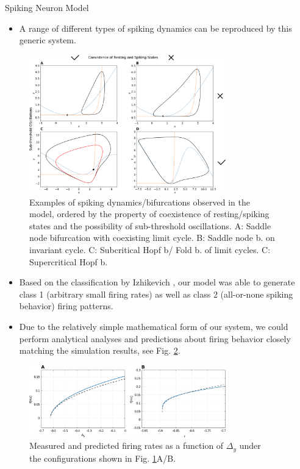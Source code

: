 \documentclass{beamer}
\begin{document}
\begin{frame}[t]
\begin{columns}[t]
\begin{column}{.45\textwidth}
\begin{myblock}{Spiking Neuron Model}
\begin{itemize}
\item A range of different types of spiking dynamics can be reproduced by this generic system.
\end{itemize}
\begin{figure}
\includegraphics[width=0.8\textwidth]{../figures/graphics/bif_types_combined_figure.png}
\caption{Examples of spiking dynamics/bifurcations observed in the model, ordered by the property of coexistence of resting/spiking states and the possibility of sub-threshold oscillations. A: Saddle node bifurcation with coexisting limit cycle. B: Saddle node b. on invariant cycle. C: Subcritical Hopf b/ Fold b. of limit cycles. C: Supercritical Hopf b.}
\label{fig:bif_types_combined}
\end{figure}
\begin{itemize}
\item Based on the classification by Izhikevich \cite{Izhikevich_2007}, our model was able to generate class 1 (arbitrary small firing rates) as well as class 2 (all-or-none spiking behavior) firing patterns.
\item Due to the relatively simple mathematical form of our system, we could perform analytical analyses and predictions about firing behavior closely matching the simulation results, see Fig. \ref{fig:saddle_bif_fir_rates}.
\end{itemize}
\begin{figure}
\includegraphics[width=0.8\textwidth]{../figures/graphics/saddle_bif_fir_rates_combined.png}
\caption{Measured and predicted firing rates as a function of $\Delta_y$ under the configurations shown in Fig. \ref{fig:bif_types_combined}A/B.}
\label{fig:saddle_bif_fir_rates}
\end{figure}
\end{myblock}
\end{column}
\begin{column}{.45\textwidth}


\end{column}
\end{columns}
\end{frame}
\end{document}
